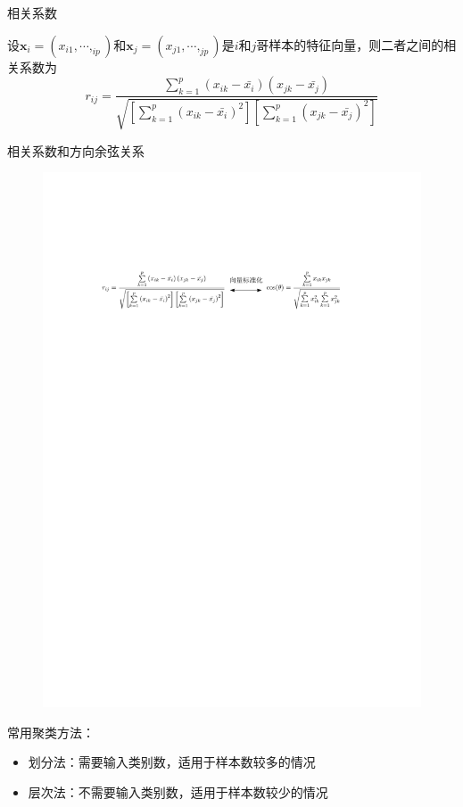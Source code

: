 \textcolor{main1}{相关系数}
\begin{definition}[相关系数]
    设$\boldsymbol{x}_{i} = \left( x_{i1},\cdots,_{ip} \right)$和$\boldsymbol{x}_{j} = \left( x_{j1},\cdots,_{jp} \right)$是$i$和$j$哥样本的特征向量，则二者之间的相关系数为
    \[
        r_{ij} = \dfrac{\sum\limits_{k = 1}^{p}\left( x_{ik}-\bar{x_{i}} \right)\left( x_{jk}-\bar{x_{j}} \right)}{\sqrt{\left[\sum\limits_{k = 1}^{p} \left( x_{ik}-\bar{x_{i}} \right)^2 \right]\left[\sum\limits_{k = 1}^{p} \left( x_{jk}-\bar{x_{j}} \right)^2 \right]}}
    \]
\end{definition}
\begin{note}
    相关系数和方向余弦关系
    \begin{figure}[htbp]
        \centering
        \includegraphics{image/余弦和相关系数关系.pdf}
    \end{figure}
\end{note}
\begin{note}
    常用聚类方法：
    \begin{itemize}
        \item 划分法：\textcolor{main1}{需要输入类别数}，适用于\textcolor{main2}{样本数较多}的情况
        \item 层次法：\textcolor{main1}{不需要输入类别数}，适用于\textcolor{main2}{样本数较少}的情况
    \end{itemize}
\end{note}
